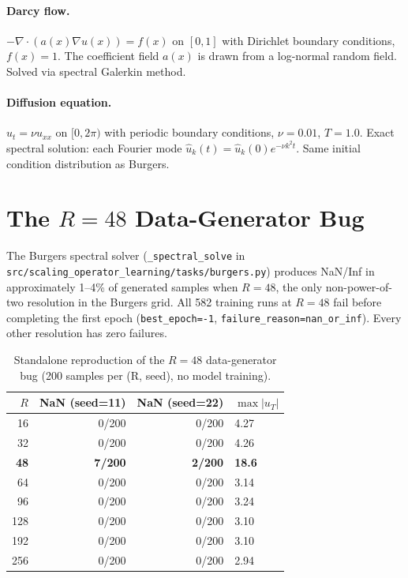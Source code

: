 \documentclass[11pt]{article}
\begin{document}
\paragraph{Darcy flow.}
$-\nabla \cdot (a(x) \nabla u(x)) = f(x)$ on $[0, 1]$ with Dirichlet
boundary conditions, $f(x) = 1$. The coefficient field $a(x)$ is drawn
from a log-normal random field. Solved via spectral Galerkin method.

\paragraph{Diffusion equation.}
$u_t = \nu u_{xx}$ on $[0, 2\pi)$ with periodic boundary conditions,
$\nu = 0.01$, $T = 1.0$. Exact spectral solution: each Fourier mode
$\hat{u}_k(t) = \hat{u}_k(0) e^{-\nu k^2 t}$. Same initial condition
distribution as Burgers.


\section{The $R{=}48$ Data-Generator Bug}
\label{app:r48}

The Burgers spectral solver (\texttt{\_spectral\_solve} in
\texttt{src/scaling\_operator\_learning/tasks/burgers.py}) produces
NaN/Inf in approximately 1--4\% of generated samples when $R{=}48$,
the only non-power-of-two resolution in the Burgers grid. All 582
training runs at $R{=}48$ fail before completing the first epoch
(\texttt{best\_epoch=-1}, \texttt{failure\_reason=nan\_or\_inf}).
Every other resolution has zero failures.

\begin{table}[h]
\centering
\caption{Standalone reproduction of the $R{=}48$ data-generator bug
(200 samples per (R, seed), no model training).}
\label{tab:r48-repro}
\begin{tabular}{@{}rrrl@{}}
\toprule
$R$ & NaN (seed=11) & NaN (seed=22) & $\max|u_T|$ \\
\midrule
16  & 0/200 & 0/200 & 4.27 \\
32  & 0/200 & 0/200 & 4.26 \\
\textbf{48} & \textbf{7/200} & \textbf{2/200} & \textbf{18.6} \\
64  & 0/200 & 0/200 & 3.14 \\
96  & 0/200 & 0/200 & 3.24 \\
128 & 0/200 & 0/200 & 3.10 \\
192 & 0/200 & 0/200 & 3.10 \\
256 & 0/200 & 0/200 & 2.94 \\
\bottomrule
\end{tabular}
\end{table}
\end{document}
